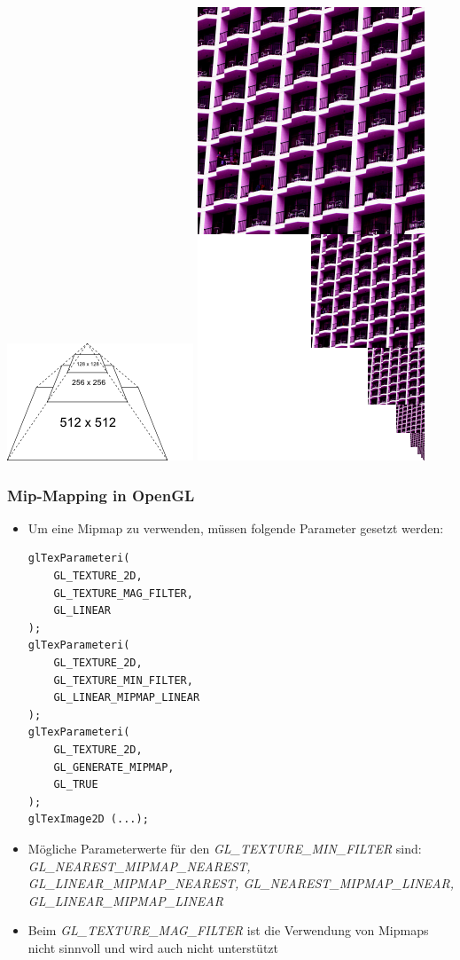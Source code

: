 \documentclass{scrartcl}
\begin{document}
\includegraphics[scale=0.5]{figures/resolution_pyramid.png}
\includegraphics[scale=0.5]{figures/texture_mipmap_256.png}

\subsubsection{Mip-Mapping in OpenGL}

\begin{itemize}
	\item Um eine Mipmap zu verwenden, müssen folgende Parameter gesetzt werden:
	\begin{lstlisting}
glTexParameteri(
	GL_TEXTURE_2D,
	GL_TEXTURE_MAG_FILTER,
	GL_LINEAR
);
glTexParameteri(
	GL_TEXTURE_2D,
	GL_TEXTURE_MIN_FILTER,
	GL_LINEAR_MIPMAP_LINEAR
);
glTexParameteri(
	GL_TEXTURE_2D,
	GL_GENERATE_MIPMAP,
	GL_TRUE
);
glTexImage2D (...);
	\end{lstlisting}
	\item Mögliche Parameterwerte für den \textit{GL\_TEXTURE\_MIN\_FILTER} sind: \textit{GL\_NEAREST\_MIPMAP\_NEAREST, GL\_LINEAR\_MIPMAP\_NEAREST, GL\_NEAREST\_MIPMAP\_LINEAR, GL\_LINEAR\_MIPMAP\_LINEAR}
	\item Beim \textit{GL\_TEXTURE\_MAG\_FILTER} ist die Verwendung von Mipmaps nicht sinnvoll und wird auch nicht unterstützt
\end{itemize}
\end{document}
